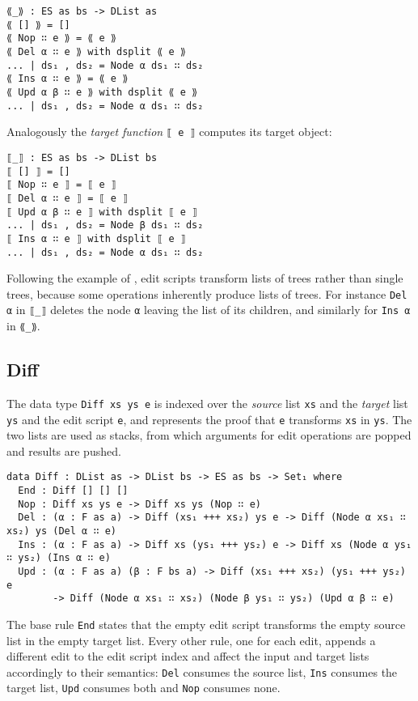 \documentclass[../Thesis.tex]{subfiles}
\begin{document}
\begin{verbatim}
⟪_⟫ : ES as bs -> DList as
⟪ [] ⟫ = []
⟪ Nop ∷ e ⟫ = ⟪ e ⟫
⟪ Del α ∷ e ⟫ with dsplit ⟪ e ⟫
... | ds₁ , ds₂ = Node α ds₁ ∷ ds₂
⟪ Ins α ∷ e ⟫ = ⟪ e ⟫
⟪ Upd α β ∷ e ⟫ with dsplit ⟪ e ⟫
... | ds₁ , ds₂ = Node α ds₁ ∷ ds₂
\end{verbatim}

Analogously the \emph{target function} \texttt{⟦ e ⟧} 
computes its target object:

\begin{verbatim}
⟦_⟧ : ES as bs -> DList bs
⟦ [] ⟧ = []
⟦ Nop ∷ e ⟧ = ⟦ e ⟧
⟦ Del α ∷ e ⟧ = ⟦ e ⟧
⟦ Upd α β ∷ e ⟧ with dsplit ⟦ e ⟧
... | ds₁ , ds₂ = Node β ds₁ ∷ ds₂
⟦ Ins α ∷ e ⟧ with dsplit ⟦ e ⟧
... | ds₁ , ds₂ = Node α ds₁ ∷ ds₂
\end{verbatim}

Following the example of \cite{Lemp09}, edit scripts transform lists of trees rather than single trees, because some operations inherently produce lists of trees.
For instance \texttt{Del α} in \texttt{⟦\_⟧} deletes the node \texttt{α} 
leaving the list of its children, and similarly for \texttt{Ins α} in \texttt{⟪\_⟫}.

	\subsection{Diff}	
	\label{subsec:Diff}
	The data type \texttt{Diff xs ys e} is indexed over the \emph{source}  list 
	\texttt{xs} and the \emph{target} list \texttt{ys} and the edit script 
	\texttt{e},  and represents the proof that \texttt{e} transforms \texttt{xs} 	in \texttt{ys}.
	The two lists are used as stacks, from which arguments for 
	edit operations are popped and results are pushed.

\begin{verbatim}
data Diff : DList as -> DList bs -> ES as bs -> Set₁ where
  End : Diff [] [] []
  Nop : Diff xs ys e -> Diff xs ys (Nop ∷ e)
  Del : (α : F as a) -> Diff (xs₁ +++ xs₂) ys e -> Diff (Node α xs₁ ∷ xs₂) ys (Del α ∷ e)
  Ins : (α : F as a) -> Diff xs (ys₁ +++ ys₂) e -> Diff xs (Node α ys₁ ∷ ys₂) (Ins α ∷ e)
  Upd : (α : F as a) (β : F bs a) -> Diff (xs₁ +++ xs₂) (ys₁ +++ ys₂) e 
        -> Diff (Node α xs₁ ∷ xs₂) (Node β ys₁ ∷ ys₂) (Upd α β ∷ e)
\end{verbatim}	

	The base rule \texttt{End} states that the empty edit script 
	transforms the empty source list in the empty target list.
	Every other rule, one for each edit, appends a different edit 
	to the edit script 	index and affect the input and target lists 
	accordingly to their 	semantics: 
	\texttt{Del} consumes the source list, \texttt{Ins} consumes the target list, 
	\texttt{Upd} consumes both and \texttt{Nop} consumes none.	
\end{document}
